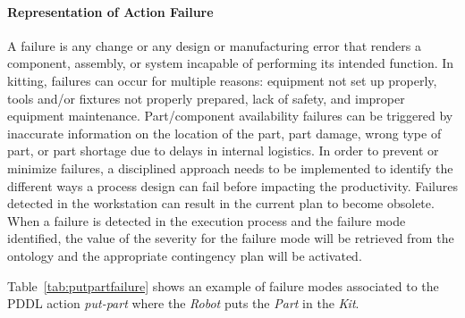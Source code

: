 \paragraph{Representation of Action Failure}\label{sss:failure}
 A failure is any change or any design or manufacturing error that renders a component, assembly, or system incapable of performing its intended function. In kitting, failures can occur for multiple reasons: equipment not set up properly, tools and/or fixtures not properly prepared, lack of safety, and improper equipment maintenance. Part/component availability failures can be triggered by inaccurate information on the location of the part, part damage, wrong type of part, or part shortage due to delays in internal logistics. In order to prevent or minimize failures, a disciplined approach needs to be implemented to identify the different ways a process design can fail before impacting the productivity. Failures detected in the workstation can result in the current plan to become obsolete. When a failure is detected in the execution process and the failure mode identified, the value of the severity for the failure mode will be retrieved from the ontology and the appropriate contingency plan will be activated.

 Table~\ref{tab:putpartfailure} shows an example of failure modes associated to the PDDL action \textsl{put-part} where the \textit{Robot} puts the \textit{Part} in the \textit{Kit}.

